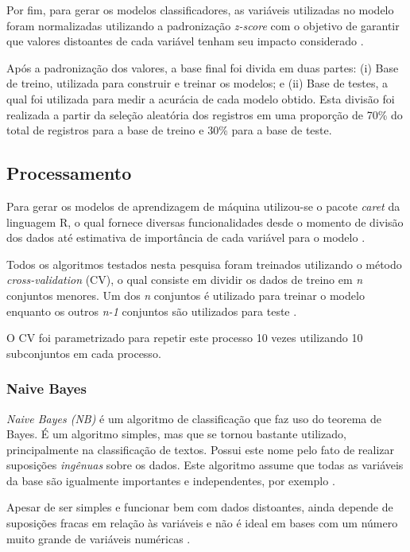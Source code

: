 \documentclass[12pt]{article}
\begin{document}
Por fim, para gerar os modelos classificadores, as variáveis utilizadas no modelo foram normalizadas utilizando a padronização \textit{z-score} com o objetivo de garantir que valores distoantes de cada variável tenham seu impacto considerado \cite{lantz:mlinR}.

Após a padronização dos valores, a base final foi divida em duas partes: (i) Base de treino, utilizada para construir e treinar os modelos; e (ii) Base de testes, a qual foi utilizada para medir a acurácia de cada modelo obtido. Esta divisão foi realizada a partir da seleção aleatória dos registros em uma proporção de 70\% do total de registros para a base de treino e 30\% para a base de teste.
    
\subsection{Processamento}

Para gerar os modelos de aprendizagem de máquina utilizou-se o pacote \textit{caret} da linguagem R, o qual fornece diversas funcionalidades desde o momento de divisão dos dados até estimativa de importância de cada variável para o modelo \cite{caret:r}.

Todos os algoritmos testados nesta pesquisa foram treinados utilizando o método \textit{cross-validation} (CV), o qual consiste em dividir os dados de treino em \textit{n} conjuntos menores. Um dos \textit{n} conjuntos é utilizado para treinar o modelo enquanto os outros \textit{n-1} conjuntos são utilizados para teste \cite{lantz:mlinR}. 

O CV foi parametrizado para repetir este processo 10 vezes utilizando 10 subconjuntos em cada processo.

\subsubsection{Naive Bayes}

\textit{Naive Bayes (NB)} é um algoritmo de classificação que faz uso do teorema de Bayes. É um algoritmo simples, mas que se tornou bastante utilizado, principalmente na classificação de textos. Possui este nome pelo fato de realizar suposições \textit{ingênuas} sobre os dados. Este algoritmo assume que todas as variáveis da base são igualmente importantes e independentes, por exemplo \cite{lantz:mlinR, aggarwal:dcaa}.

Apesar de ser simples e funcionar bem com dados distoantes, ainda depende de suposições fracas em relação às variáveis e não é ideal em bases com um número muito grande de variáveis numéricas \cite{lantz:mlinR}.
\end{document}
